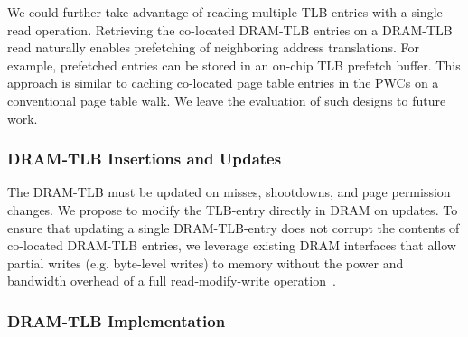 We could further take advantage of reading multiple TLB entries with a
single read operation. Retrieving the co-located DRAM-TLB entries on a
DRAM-TLB read naturally enables prefetching of neighboring address
translations. For example, prefetched entries can be stored in an
on-chip TLB prefetch buffer. This approach is similar to caching
co-located page table entries in the PWCs on a conventional page table
walk. We leave the evaluation of such designs to future work.



\subsubsection{DRAM-TLB Insertions and Updates}

\noindent The DRAM-TLB must be updated on misses, shootdowns, and page
permission changes. We propose to modify the TLB-entry directly in
DRAM on updates. To ensure that updating a single DRAM-TLB-entry does
not corrupt the contents of co-located DRAM-TLB entries, we leverage
existing DRAM interfaces that allow partial writes (e.g. byte-level
writes) to memory without the power and bandwidth overhead of a full
read-modify-write operation~\cite{hbm-spec}.






% 

\subsubsection{DRAM-TLB Implementation}

